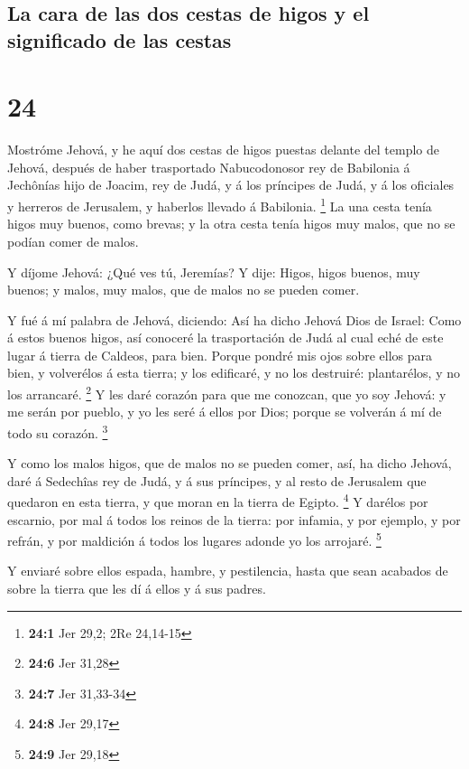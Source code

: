 \hypertarget{la-cara-de-las-dos-cestas-de-higos-y-el-significado-de-las-cestas}{%
\subsection{La cara de las dos cestas de higos y el significado de las
cestas}\label{la-cara-de-las-dos-cestas-de-higos-y-el-significado-de-las-cestas}}

\hypertarget{section-23}{%
\section{24}\label{section-23}}

 Mostróme Jehová, y he aquí dos cestas de higos puestas
delante del templo de Jehová, después de haber trasportado Nabucodonosor
rey de Babilonia á Jechônías hijo de Joacim, rey de Judá, y á los
príncipes de Judá, y á los oficiales y herreros de Jerusalem, y haberlos
llevado á Babilonia. \footnote{\textbf{24:1} Jer 29,2; 2Re 24,14-15}
 La una cesta tenía higos muy buenos, como brevas; y la otra
cesta tenía higos muy malos, que no se podían comer de malos.

 Y díjome Jehová: ¿Qué ves tú, Jeremías? Y dije: Higos,
higos buenos, muy buenos; y malos, muy malos, que de malos no se pueden
comer.

 Y fué á mí palabra de Jehová, diciendo:  Así ha
dicho Jehová Dios de Israel: Como á estos buenos higos, así conoceré la
trasportación de Judá al cual eché de este lugar á tierra de Caldeos,
para bien.  Porque pondré mis ojos sobre ellos para bien, y
volverélos á esta tierra; y los edificaré, y no los destruiré:
plantarélos, y no los arrancaré. \footnote{\textbf{24:6} Jer 31,28}
 Y les daré corazón para que me conozcan, que yo soy Jehová:
y me serán por pueblo, y yo les seré á ellos por Dios; porque se
volverán á mí de todo su corazón. \footnote{\textbf{24:7} Jer 31,33-34}

 Y como los malos higos, que de malos no se pueden comer,
así, ha dicho Jehová, daré á Sedechîas rey de Judá, y á sus príncipes, y
al resto de Jerusalem que quedaron en esta tierra, y que moran en la
tierra de Egipto. \footnote{\textbf{24:8} Jer 29,17}  Y
darélos por escarnio, por mal á todos los reinos de la tierra: por
infamia, y por ejemplo, y por refrán, y por maldición á todos los
lugares adonde yo los arrojaré. \footnote{\textbf{24:9} Jer 29,18}

 Y enviaré sobre ellos espada, hambre, y pestilencia, hasta
que sean acabados de sobre la tierra que les dí á ellos y á sus padres.

